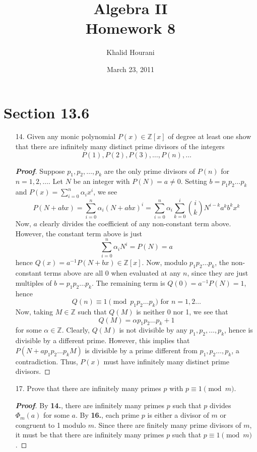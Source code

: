 \documentclass[12pt,leqno]{article}
\title{Algebra II\\\large Homework 8}
\date{March 23, 2011}
\author{Khalid Hourani}
\theoremstyle{definition}
\newcommand{\Z}{\mathbb{Z}}
\newcommand{\+}{\oplus}
\newenvironment{Proof}{\begin{proof}[\textnormal{\textbf{Proof}}]}{\end{proof}}
\begin{document}
 \begin{titlepage}
  \maketitle
 \end{titlepage}

\section*{Section 13.6}
  \begin{enumerate}
   \item [14.] Given any monic polynomial $P(x)\in\Z[x]$ of degree at least one show that there are infinitely many distinct prime divisors of the integers \[P(1),P(2),P(3),\hdots,P(n),\hdots\]
    \begin{Proof}
     Suppose $p_1,p_2,\hdots,p_k$ are the only prime divisors of $P(n)$ for $n=1,2,\hdots$. Let $N$ be an integer with $P(N)=a\not=0$. Setting $b=p_1p_2\hdots p_k$ and $P(x)=\sum_{i=0}^n\alpha_ix^i$, we see \[P(N+abx)=\sum_{i=0}^n\alpha_i(N+abx)^i=\sum_{i=0}^n\alpha_i\sum_{k=0}^i{i\choose k}N^{i-k}a^kb^kx^k\] Now, $a$ clearly divides the coefficient of any non-constant term above. However, the constant term above is just \[\sum_{i=0}^n\alpha_iN^i=P(N)=a\] hence $Q(x)=a^{-1}P(N+bx)\in\Z[x]$. Now, modulo $p_1p_2\hdots p_k$, the non-constant terms above are all 0 when evaluated at any $n$, since they are just multiples of $b=p_1p_2\hdots p_k$. The remaining term is $Q(0)=a^{-1}P(N)=1$, hence \[Q(n)\equiv1\pmod{p_1p_2\hdots p_k}\text{ for }n=1,2\hdots\] Now, taking $M\in\Z$ such that $Q(M)$ is neither 0 nor 1, we see that \[Q(M)=\alpha p_1p_2\hdots p_k+1\] for some $\alpha\in\Z$. Clearly, $Q(M)$ is not divisible by any $p_1,p_2,\hdots,p_k$, hence is divisible by a different prime. However, this implies that $P(N+ap_1p_2\hdots p_kM)$ is divisible by a prime different from $p_1,p_2\hdots, p_k$, a contradiction. Thus, $P(x)$ must have infinitely many distinct prime divisors.
    \end{Proof}

   \item [17.] Prove that there are infinitely many primes $p$ with $p\equiv1\pmod{m}$. 
    \begin{Proof}
     By \textbf{14.}, there are infinitely many primes $p$ such that $p$ divides $\varPhi_m(a)$ for some $a$. By \textbf{16.}, each prime $p$ is either a divisor of $m$ or congruent to 1 modulo $m$. Since there are finitely many prime divisors of $m$, it must be that there are infinitely many primes $p$ such that $p\equiv1\pmod{m}$.
    \end{Proof}
  \end{enumerate}
\end{document}
